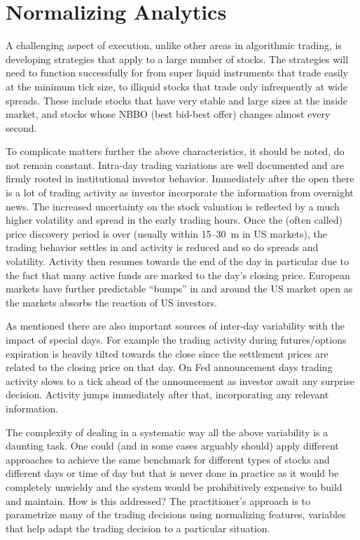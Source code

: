 \section{Normalizing Analytics}

A challenging aspect of execution, unlike other areas in algorithmic trading, is developing strategies that apply to a large number of stocks. The strategies will need to function successfully for from super liquid instruments that trade easily at the minimum tick size, to illiquid stocks that trade only infrequently at wide spreads. These include stocks that have very stable and large sizes at the inside market, and stocks whose NBBO (best bid-best offer) changes almost every second.


To complicate matters further the above characteristics, it should be noted, do not remain constant. Intra-day trading variations are well documented and are firmly rooted in institutional investor behavior. Immediately after the open there is a lot of trading activity as investor incorporate the information from overnight news. The increased uncertainty on the stock valuation is reflected by a much higher volatility and spread in the early trading hours. Once the (often called) price discovery period is over (usually within 15--30~m in US markets), the trading behavior settles in and activity is reduced and so do spreads and volatility. Activity then resumes towards the end of the day in particular due to the  fact that many active funds are marked to the day's closing price. European markets have further predictable ``bumps'' in and around the US market open as the markets absorbs the reaction of US investors.


As mentioned there are also important sources of inter-day variability with the impact of special days. For  example the trading activity during futures/options expiration is heavily tilted towards the close since the settlement prices are related to the closing price on that day. On Fed announcement days trading activity slows to a tick ahead of the announcement as investor await any surprise decision. Activity jumps immediately after that, incorporating any relevant information.


The complexity of dealing in a systematic way all the above variability is a daunting task. One could (and in some cases arguably should) apply different approaches to achieve the same benchmark for different types of stocks and different days or time of day but that is never done in practice as it would be completely unwieldy and the system would be prohibitively expensive to build and maintain. How is this addressed? The practitioner's approach is to parametrize many of the trading decisions using normalizing features, variables that help adapt the trading decision to a particular situation.


